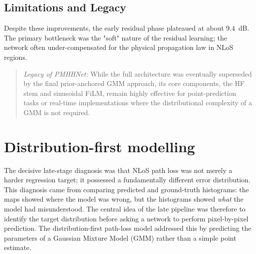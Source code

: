 \subsection{Limitations and Legacy}

Despite these improvements, the early residual phase plateaued at about
\SI{9.4}{dB}. The primary bottleneck was the "soft" nature of the
residual learning; the network often under-compensated for the physical
propagation law in NLoS regions.

\begin{quote}
\textit{Legacy of PMHHNet:} While the full architecture was eventually superseded
by the final prior-anchored GMM approach, its core components, the
HF stem and sinusoidal FiLM, remain highly effective for point-prediction
tasks or real-time implementations where the distributional complexity of a GMM
is not required.
\end{quote}

\section{Distribution-first modelling}
\label{sec:dist_first}

The decisive late-stage diagnosis was that NLoS path loss was not merely a
harder regression target; it possessed a fundamentally different error
distribution.  This diagnosis came from comparing predicted and ground-truth
histograms: the maps showed where the model was wrong, but the histograms
showed \emph{what} the model had misunderstood.  The central idea of the late
pipeline was therefore to identify the target distribution before asking a
network to perform pixel-by-pixel prediction. The distribution-first path-loss
model addressed this by
predicting the parameters of a Gaussian Mixture Model (GMM) rather than a
simple point estimate.

